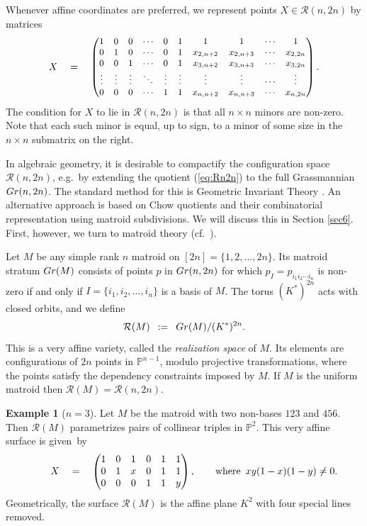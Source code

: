 \documentclass[12pt]{extarticle}
\theoremstyle{definition}
\newtheorem{example}[theorem]{Example}
\numberwithin{theorem}{section}
\theoremstyle{plain}\newtheorem{ithm}{Theorem}
\newcommand{\PP}{\mathbb{P}}
\begin{document}
Whenever affine coordinates are preferred, we represent points $X \in \mathcal{R}(n,2n)$ by matrices
\begin{equation}
\label{eq:bymatrices}
 X \quad = \quad  \begin{small}
\begin{pmatrix} 
1 & 0  & 0 & \cdots & 0 & 1  & 1 & 1 & \cdots  &1 \\
0 & 1 & 0 & \cdots & 0 & 1 & x_{2,n+2} & x_{2,n+3} & \cdots & x_{2,2n}  \\
0 & 0 & 1 & \cdots & 0 & 1 & x_{3,n+2} & x_{3,n+3} & \cdots & x_{3,2n}  \\
\vdots & \vdots & \vdots & \ddots & \vdots & \vdots & \vdots & \vdots & \cdots & \vdots \\
0 & 0 & 0 & \cdots & 1 & 1 & x_{n,n+2} & x_{n,n+3} & \cdots & x_{n,2n} 
\end{pmatrix}. \end{small}
\end{equation}
The condition for $X$ to lie in $\mathcal{R}(n,2n)$ is that all 
$n \times n$ minors are non-zero. Note that each such minor is equal,
up to sign, to a minor of some size in the $n \times n $ submatrix on the right.

In algebraic geometry, it is desirable to
compactify the configuration space
$\mathcal{R}(n,2n)$, e.g.~by extending the quotient (\ref{eq:Rn2n})
to the full Grassmannian ${\rm Gr}(n,2n)$. The standard method for this is
Geometric Invariant Theory \cite[\S II.1]{DO}.
An alternative approach is based on
Chow quotients \cite{Kap, KT}
and their combinatorial representation  using matroid subdivisions.
We will discuss this  in Section \ref{sec6}.
First, however, we turn to matroid theory (cf.~\cite[\S 13.1]{INLA}).

Let $M$ be any 
simple rank $n$ matroid on  $[2n] =\{1,2,\ldots,2n\}$.
Its matroid stratum ${\rm Gr}(M)$  consists of points $p$ in
${\rm Gr}(n,2n)$ for which $p_I = p_{i_1 i_2 \cdots i_n} $
is non-zero if and only if $I = \{i_1,i_2,\ldots,i_n\}$ is a basis of $M$.
The torus $(K^*)^{2n}$ acts with closed orbits, and we  define
$$ \mathcal{R}(M) \,\,\, := \,\,\, {\rm Gr}(M)/(K^*)^{2n}. $$
This is a very affine variety, called  the {\em realization space} of $M$.
Its elements are configurations of $2n$ points in $\PP^{n-1}$,
modulo projective transformations, where the points 
satisfy the dependency constraints imposed by $M$.
If $M$ is the uniform matroid then $\mathcal{R}(M) = \mathcal{R}(n,2n)$.

\begin{example}[$n=3$] \label{ex:36two}
Let $M$ be the matroid with two non-bases $123$ and $456$.
Then $\mathcal{R}(M)$ parametrizes pairs of collinear triples in $\PP^2$. 
This very affine surface is given~by
$$ \qquad
X \quad = \quad 
\begin{pmatrix}
1 & 0 & 1 & 0 & 1 & 1 \\  
0 & 1 & x & 0 & 1 & 1 \\
0 & 0 & 0 & 1 & 1 & y \end{pmatrix}, \qquad
\hbox{where} \,\, \,x y (1-x) (1-y) \not= 0.
$$
Geometrically, the surface $\mathcal{R}(M)$ is the affine plane $K^2$ with four 
special lines removed.
\end{example}
\end{document}
